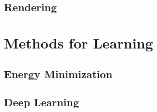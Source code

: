 \subsection{Rendering}

\section{Methods for Learning}

\subsection{Energy Minimization}

\subsection{Deep Learning}



